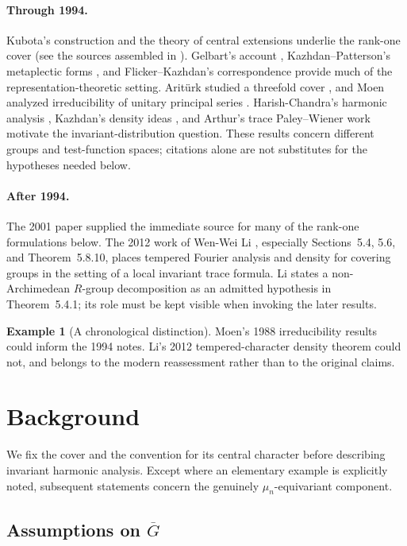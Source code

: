 \documentclass[12pt,letterpaper]{article}
\theoremstyle{definition}
\newtheorem{example}[theorem]{Example}
\theoremstyle{remark}
\begin{document}
\paragraph{Through 1994.}
Kubota's construction and the theory of central extensions underlie the
rank-one cover (see the sources assembled in \cite{Jo94}).  Gelbart's
account \cite{Ge76}, Kazhdan--Patterson's metaplectic forms \cite{KP84},
and Flicker--Kazhdan's correspondence \cite{FK86} provide much of the
representation-theoretic setting.  Arit\"urk studied a threefold cover
\cite{Ar80}, and Moen analyzed irreducibility of unitary principal series
\cite{Mo88}.  Harish-Chandra's harmonic analysis \cite{HC70,HC78},
Kazhdan's density ideas \cite{Ka86}, and Arthur's trace Paley--Wiener
work \cite{Ar94} motivate the invariant-distribution question.  These
results concern different groups and test-function spaces; citations
alone are not substitutes for the hypotheses needed below.
\paragraph{After 1994.}
The 2001 paper \cite{Jo01} supplied the immediate source for many of the
rank-one formulations below.  The 2012 work of Wen-Wei Li
\cite{Li12}, especially Sections~5.4, 5.6, and Theorem~5.8.10,
places tempered Fourier analysis and density for covering groups in the
setting of a local invariant trace formula.  Li states a non-Archimedean
$R$-group decomposition as an admitted hypothesis in Theorem~5.4.1;
its role must be kept visible when invoking the later results.

\begin{example}[A chronological distinction]
Moen's 1988 irreducibility results \cite{Mo88} could inform the 1994
notes.  Li's 2012 tempered-character density theorem \cite{Li12}
could not, and belongs to the modern reassessment rather than to
the original claims.
\end{example}

\section{Background}\label{sec:background}
We fix the cover and the convention for its central character before
describing invariant harmonic analysis.  Except where an elementary
example is explicitly noted, subsequent statements concern the genuinely
$\mu_n$-equivariant component.


\subsection{Assumptions on \texorpdfstring{$\overline{G}$}{the covering group}}\label{section:assume}
\end{document}

